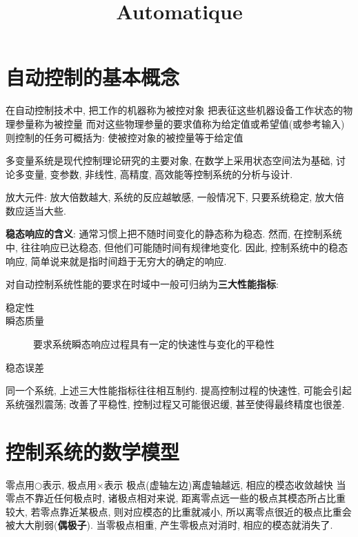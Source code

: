 \documentclass{article}
\begin{document}
\title{Automatique}
\maketitle
\tableofcontents
\newpage
\section{自动控制的基本概念}
在自动控制技术中, 把工作的机器称为被控对象
把表征这些机器设备工作状态的物理参量称为被控量
而对这些物理参量的要求值称为给定值或希望值(或参考输入)
则控制的任务可概括为: 使被控对象的被控量等于给定值

多变量系统是现代控制理论研究的主要对象, 在数学上采用状态空间法为基础, 讨论多变量, 变参数, 非线性, 高精度, 高效能等控制系统的分析与设计.

放大元件: 放大倍数越大, 系统的反应越敏感, 一般情况下, 只要系统稳定, 放大倍数应适当大些.

\textbf{稳态响应的含义}: 通常习惯上把不随时间变化的静态称为稳态. 然而, 在控制系统中, 往往响应已达稳态, 但他们可能随时间有规律地变化. 因此, 控制系统中的稳态响应, 简单说来就是指时间趋于无穷大的确定的响应.

对自动控制系统性能的要求在时域中一般可归纳为\textbf{三大性能指标}:
\begin{description}
\item[稳定性]
\item[瞬态质量] 要求系统瞬态响应过程具有一定的快速性与变化的平稳性
\item[稳态误差]
\end{description}
同一个系统, 上述三大性能指标往往相互制约. 提高控制过程的快速性, 可能会引起系统强烈震荡; 改善了平稳性, 控制过程又可能很迟缓, 甚至使得最终精度也很差.

\section{控制系统的数学模型}
零点用$\bigcirc$表示, 极点用$\times$表示 \newline
极点(虚轴左边)离虚轴越远, 相应的模态收敛越快 \newline
当零点不靠近任何极点时, 诸极点相对来说, 距离零点远一些的极点其模态所占比重较大, 若零点靠近某极点, 则对应模态的比重就减小, 所以离零点很近的极点比重会被大大削弱(\textbf{偶极子}). 当零极点相重, 产生零极点对消时, 相应的模态就消失了.
\end{document}
